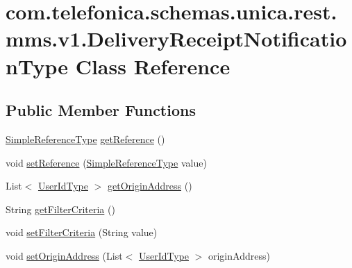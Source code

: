 \hypertarget{classcom_1_1telefonica_1_1schemas_1_1unica_1_1rest_1_1mms_1_1v1_1_1DeliveryReceiptNotificationType}{
\section{com.telefonica.schemas.unica.rest.mms.v1.DeliveryReceiptNotificationType Class Reference}
\label{classcom_1_1telefonica_1_1schemas_1_1unica_1_1rest_1_1mms_1_1v1_1_1DeliveryReceiptNotificationType}
}
\subsection*{Public Member Functions}
\begin{DoxyCompactItemize}
\item 
\hyperlink{classcom_1_1telefonica_1_1schemas_1_1unica_1_1rest_1_1common_1_1v1_1_1SimpleReferenceType}{SimpleReferenceType} \hyperlink{classcom_1_1telefonica_1_1schemas_1_1unica_1_1rest_1_1mms_1_1v1_1_1DeliveryReceiptNotificationType_a54da4146d7cc836db8f0a5ec18ecf5c3}{getReference} ()
\item 
void \hyperlink{classcom_1_1telefonica_1_1schemas_1_1unica_1_1rest_1_1mms_1_1v1_1_1DeliveryReceiptNotificationType_afe66c6408ad6277da325974d257db212}{setReference} (\hyperlink{classcom_1_1telefonica_1_1schemas_1_1unica_1_1rest_1_1common_1_1v1_1_1SimpleReferenceType}{SimpleReferenceType} value)
\item 
List$<$ \hyperlink{classcom_1_1telefonica_1_1schemas_1_1unica_1_1rest_1_1common_1_1v1_1_1UserIdType}{UserIdType} $>$ \hyperlink{classcom_1_1telefonica_1_1schemas_1_1unica_1_1rest_1_1mms_1_1v1_1_1DeliveryReceiptNotificationType_a615f2881fd21c3bfe5458a731bfd6182}{getOriginAddress} ()
\item 
String \hyperlink{classcom_1_1telefonica_1_1schemas_1_1unica_1_1rest_1_1mms_1_1v1_1_1DeliveryReceiptNotificationType_a259feb69da090bf9e88a4badecbfb298}{getFilterCriteria} ()
\item 
void \hyperlink{classcom_1_1telefonica_1_1schemas_1_1unica_1_1rest_1_1mms_1_1v1_1_1DeliveryReceiptNotificationType_a095097c7187e9e133394ef61959e86e1}{setFilterCriteria} (String value)
\item 
void \hyperlink{classcom_1_1telefonica_1_1schemas_1_1unica_1_1rest_1_1mms_1_1v1_1_1DeliveryReceiptNotificationType_a2ad25571554eacd4f690b1d8f444fd1c}{setOriginAddress} (List$<$ \hyperlink{classcom_1_1telefonica_1_1schemas_1_1unica_1_1rest_1_1common_1_1v1_1_1UserIdType}{UserIdType} $>$ originAddress)
\end{DoxyCompactItemize}
